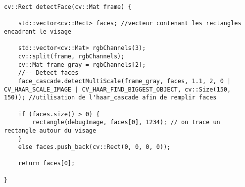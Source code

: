 \begin{lstlisting}
cv::Rect detectFace(cv::Mat frame) {

	std::vector<cv::Rect> faces; //vecteur contenant les rectangles encadrant le visage

	std::vector<cv::Mat> rgbChannels(3);
	cv::split(frame, rgbChannels);
	cv::Mat frame_gray = rgbChannels[2];
	//-- Detect faces
	face_cascade.detectMultiScale(frame_gray, faces, 1.1, 2, 0 | CV_HAAR_SCALE_IMAGE | CV_HAAR_FIND_BIGGEST_OBJECT, cv::Size(150, 150)); //utilisation de l'haar_cascade afin de remplir faces

	if (faces.size() > 0) {
		rectangle(debugImage, faces[0], 1234); // on trace un rectangle autour du visage
	}
	else faces.push_back(cv::Rect(0, 0, 0, 0));

	return faces[0];

}
\end{lstlisting}